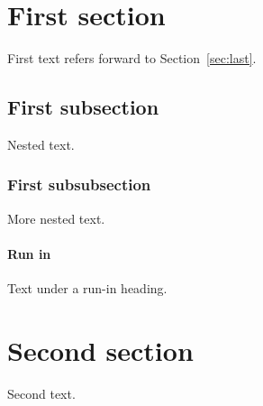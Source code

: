 \section{First section}\label{sec:first}
First text refers forward to Section~\ref{sec:last}.
\subsection{First subsection}
Nested text.
\subsubsection{First subsubsection}
More nested text.
\paragraph{Run in} Text under a run-in heading.
\section{Second section}
Second text.
